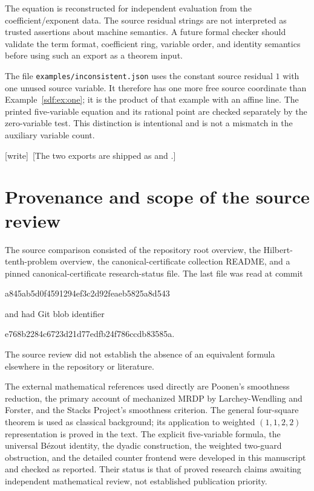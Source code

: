 \documentclass[11pt,a4paper]{article}
\theoremstyle{definition}
\theoremstyle{remark}
\newcommand{\wtag}{\textup{[write]}}
\begin{document}
The equation is reconstructed for independent evaluation from the
coefficient/exponent data. The source residual strings are not interpreted
as trusted assertions about machine semantics. A future formal checker
should validate the term format, coefficient ring, variable order, and
identity semantics before using such an export as a theorem input.

The file \texttt{examples/inconsistent.json} uses the constant source
residual $1$ with one unused source variable. It therefore has one more
free source coordinate than Example~\ref{sdf:ex:one}; it is the product of
that example with an affine line. The printed five-variable equation and
its rational point are checked separately by the zero-variable test.
This distinction is intentional and is not a mismatch in the auxiliary
variable count.

\wtag\ [The two exports are shipped as
 and
.]

\section{Provenance and scope of the source review}\label{sdf:app:sourcereview}

The source comparison consisted of the repository root overview, the
Hilbert-tenth-problem overview, the canonical-certificate collection
README, and a pinned canonical-certificate research-status file. The
last file was read at commit
\begin{center}\small\ttfamily a845ab5d0f4591294ef3c2d92feaeb5825a8d543\end{center}
and had Git blob identifier
\begin{center}\small\ttfamily e768b2284c6723d21d77edfb24f786ccdb83585a.\end{center}
The source review did not establish the absence of an equivalent formula
elsewhere in the repository or literature.

The external mathematical references used directly are Poonen's smoothness
reduction, the primary account of mechanized MRDP by Larchey-Wendling and
Forster, and the Stacks Project's smoothness criterion. The general
four-square theorem is used as classical background; its application to
weighted $(1,1,2,2)$ representation is proved in the text. The explicit
five-variable formula, the universal B\'ezout identity, the dyadic
construction, the weighted two-guard obstruction, and the detailed
counter frontend were developed in this manuscript and checked as
reported. Their status is that of proved research claims awaiting
independent mathematical review, not established publication priority.
\end{document}
